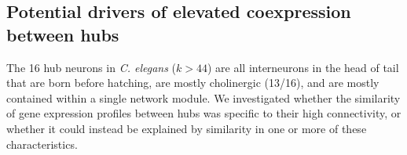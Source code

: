 \documentclass[10pt,letterpaper]{article}
\begin{document}
\subsection*{Potential drivers of elevated coexpression between hubs}
The 16 hub neurons in \emph{C. elegans} ($k > 44$) are all interneurons in the head of tail that are born before hatching, are mostly cholinergic (13/16), and are mostly contained within a single network module.
We investigated whether the similarity of gene expression profiles between hubs was specific to their high connectivity, or whether it could instead be explained by similarity in one or more of these characteristics.


\end{document}
